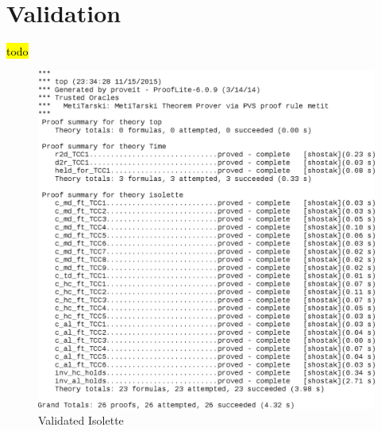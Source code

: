 \documentclass[fontsize=12pt,paper=letter,twoside]{scrartcl}
\begin{document}

\newpage




\newpage



\newpage



\newpage



\newpage




\newpage





\section{Validation}
\hl{todo}
\begin{figure}[!htb]
\begin{center}
\includegraphics[width=1\textwidth]{pics/top.png}
\end{center}
\caption{Validated Isolette}
\label{proofs}
\end{figure}
\end{document}
